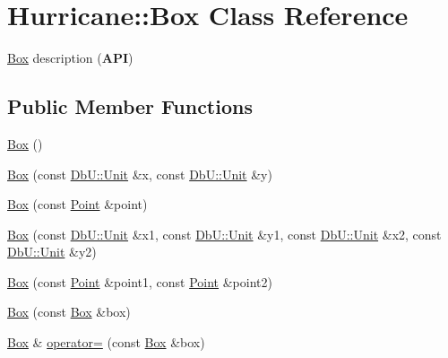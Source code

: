 \hypertarget{classHurricane_1_1Box}{}\section{Hurricane\+:\+:Box Class Reference}
\label{classHurricane_1_1Box}


\mbox{\hyperlink{classHurricane_1_1Box}{Box}} description ({\bfseries A\+PI})  


\subsection*{Public Member Functions}
\begin{DoxyCompactItemize}
\item 
\mbox{\hyperlink{classHurricane_1_1Box_a445dd24bf83759bb47fc483fc7da024f}{Box}} ()
\item 
\mbox{\hyperlink{classHurricane_1_1Box_af53adb323e9e89eef4e96da9efc33fe9}{Box}} (const \mbox{\hyperlink{group__DbUGroup_ga4fbfa3e8c89347af76c9628ea06c4146}{Db\+U\+::\+Unit}} \&x, const \mbox{\hyperlink{group__DbUGroup_ga4fbfa3e8c89347af76c9628ea06c4146}{Db\+U\+::\+Unit}} \&y)
\item 
\mbox{\hyperlink{classHurricane_1_1Box_a2f2aa57fa9486b508fca2a060648d04a}{Box}} (const \mbox{\hyperlink{classHurricane_1_1Point}{Point}} \&point)
\item 
\mbox{\hyperlink{classHurricane_1_1Box_a101cd5a10d6cf229ccedccbb5417ed55}{Box}} (const \mbox{\hyperlink{group__DbUGroup_ga4fbfa3e8c89347af76c9628ea06c4146}{Db\+U\+::\+Unit}} \&x1, const \mbox{\hyperlink{group__DbUGroup_ga4fbfa3e8c89347af76c9628ea06c4146}{Db\+U\+::\+Unit}} \&y1, const \mbox{\hyperlink{group__DbUGroup_ga4fbfa3e8c89347af76c9628ea06c4146}{Db\+U\+::\+Unit}} \&x2, const \mbox{\hyperlink{group__DbUGroup_ga4fbfa3e8c89347af76c9628ea06c4146}{Db\+U\+::\+Unit}} \&y2)
\item 
\mbox{\hyperlink{classHurricane_1_1Box_a47f434b4dbda6af14a354722f66a47da}{Box}} (const \mbox{\hyperlink{classHurricane_1_1Point}{Point}} \&point1, const \mbox{\hyperlink{classHurricane_1_1Point}{Point}} \&point2)
\item 
\mbox{\hyperlink{classHurricane_1_1Box_af9a7605270bf1ebb38723fba5b9d9236}{Box}} (const \mbox{\hyperlink{classHurricane_1_1Box}{Box}} \&box)
\item 
\mbox{\hyperlink{classHurricane_1_1Box}{Box}} \& \mbox{\hyperlink{classHurricane_1_1Box_a01abf59b3d3e99e694a7d4789f1bb978}{operator=}} (const \mbox{\hyperlink{classHurricane_1_1Box}{Box}} \&box)

\end{DoxyCompactItemize}
